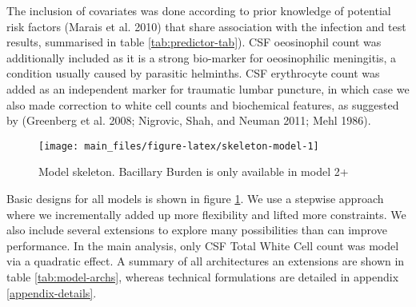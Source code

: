 \documentclass[
]{article}
\begin{document}
The inclusion of covariates was done according to prior knowledge of potential risk factors (Marais et al. 2010) that share association with the infection and test results, summarised in table \ref{tab:predictor-tab}). CSF oeosinophil count was additionally included as it is a strong bio-marker for oeosinophilic meningitis, a condition usually caused by parasitic helminths. CSF erythrocyte count was added as an independent marker for traumatic lumbar puncture, in which case we also made correction to white cell counts and biochemical features, as suggested by (Greenberg et al. 2008; Nigrovic, Shah, and Neuman 2011; Mehl 1986).

\begin{figure}

{\centering \texttt{[image: main\_files/figure-latex/skeleton-model-1]} 

}

\caption{Model skeleton. Bacillary Burden is only available in model 2+}\label{fig:skeleton-model}
\end{figure}

Basic designs for all models is shown in figure \ref{fig:skeleton-model}. We use a stepwise approach where we incrementally added up more flexibility and lifted more constraints. We also include several extensions to explore many possibilities than can improve performance. In the main analysis, only CSF Total White Cell count was model via a quadratic effect. A summary of all architectures an extensions are shown in table \ref{tab:model-archs}, whereas technical formulations are detailed in appendix \ref{appendix-details}.

\providecommand{\docline}[3]{\noalign{\global\setlength{\arrayrulewidth}{#1}}\arrayrulecolor[HTML]{#2}\cline{#3}}

\setlength{\tabcolsep}{2pt}

\renewcommand*{\arraystretch}{1.5}
\end{document}

